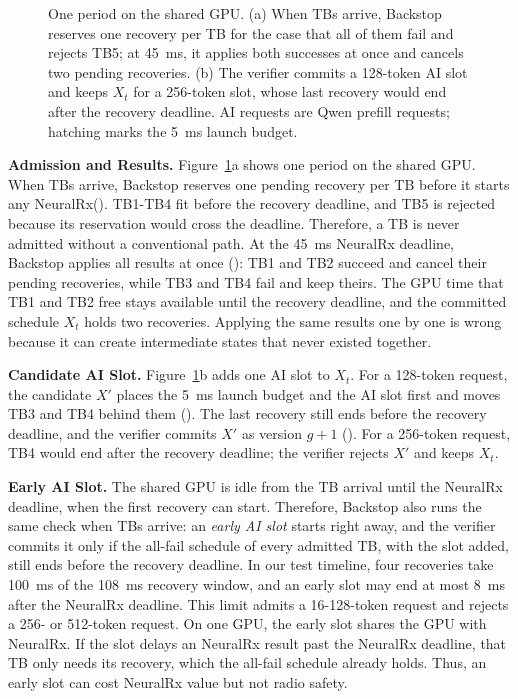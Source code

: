 \documentclass[acmsmall,screen,review,anonymous]{acmart}
\newcommand{\sys}{Backstop\xspace}
\newcommand{\NRx}{NeuralRx\xspace}
\begin{document}
\begin{figure}[H]
  \centering
  
  \caption{One period on the shared GPU. (a) When TBs arrive, \sys reserves one recovery per TB for the
  case that all of them fail and rejects TB5; at 45~ms, it applies both successes at once and cancels
  two pending recoveries. (b) The verifier commits a 128-token AI slot and keeps $X_t$ for a 256-token
  slot, whose last recovery would end after the recovery deadline. AI requests are Qwen prefill
  requests; hatching marks the 5~ms launch budget.}
  \label{fig:atomic-replan}
\end{figure}

\noindent\textbf{Admission and Results.}
Figure~\ref{fig:atomic-replan}a shows one period on the shared GPU. When TBs arrive, \sys reserves one
pending recovery per TB before it starts any \NRx (). TB1-TB4 fit before the recovery
deadline, and TB5 is rejected because its reservation would cross the deadline. Therefore, a TB is never
admitted without a conventional path. At the 45~ms \NRx deadline, \sys applies all results at once
(): TB1 and TB2 succeed and cancel their pending recoveries, while TB3 and TB4 fail and keep
theirs. The GPU time that TB1 and TB2 free stays available until the recovery deadline, and the committed
schedule $X_t$ holds two recoveries. Applying the same results one by one is wrong because it can create
intermediate states that never existed together.

\noindent\textbf{Candidate AI Slot.}
Figure~\ref{fig:atomic-replan}b adds one AI slot to $X_t$. For a 128-token request, the candidate $X'$
places the 5~ms launch budget and the AI slot first and moves TB3 and TB4 behind them (). The
last recovery still ends before the recovery deadline, and the verifier commits $X'$ as version $g+1$
(). For a 256-token request, TB4 would end after the recovery deadline; the verifier rejects
$X'$ and keeps $X_t$.

\noindent\textbf{Early AI Slot.}
The shared GPU is idle from the TB arrival until the \NRx deadline, when the first recovery can start.
Therefore, \sys also runs the same check when TBs arrive: an \emph{early AI slot} starts right away, and
the verifier commits it only if the all-fail schedule of every admitted TB, with the slot added, still
ends before the recovery deadline. In our test timeline, four recoveries take 100~ms of the 108~ms
recovery window, and an early slot may end at most 8~ms after the \NRx deadline. This limit admits a
16-128-token request and rejects a 256- or 512-token request. On one GPU, the early slot shares the GPU
with \NRx. If the slot delays an \NRx result past the \NRx deadline, that TB only needs its recovery,
which the all-fail schedule already holds. Thus, an early slot can cost \NRx value but not radio safety.
\end{document}
